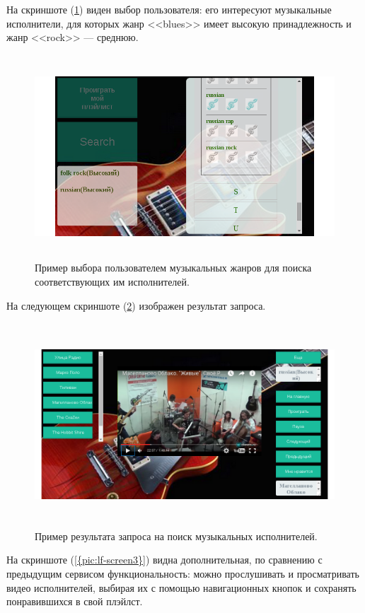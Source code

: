 На скриншоте (\ref{pic:lf-screen1}) виден выбор пользователя: его интересуют музыкальные исполнители, для которых жанр <<blues>> имеет
высокую принадлежность и жанр <<rock>> --- среднюю.
\begin{figure}[h]
	\label{pic:lf-screen1}
\caption{Пример выбора пользователем музыкальных жанров для поиска соответствующих им исполнителей.}
\begin{center}
  \includegraphics[width=5in,height=3in]{pics/lastfm-interface.png}
\end{center}
\end{figure}

На следующем скриншоте (\ref{pic:lf-screen2}) изображен результат запроса.
\begin{figure}[h]
\label{pic:lf-screen2}
\caption{Пример результата запроса на поиск музыкальных исполнителей.}
\begin{center}
  \includegraphics[width=5in,height=3in]{pics/lastfm-rslt.png}
\end{center}
\end{figure}

На скриншоте (\ref{{pic:lf-screen3}}) видна дополнительная, по сравнению с предыдущим сервисом функциональность: можно прослушивать и просматривать
видео исполнителей, выбирая их с помощью навигационных кнопок и сохранять понравившихся в свой плэйлст.

